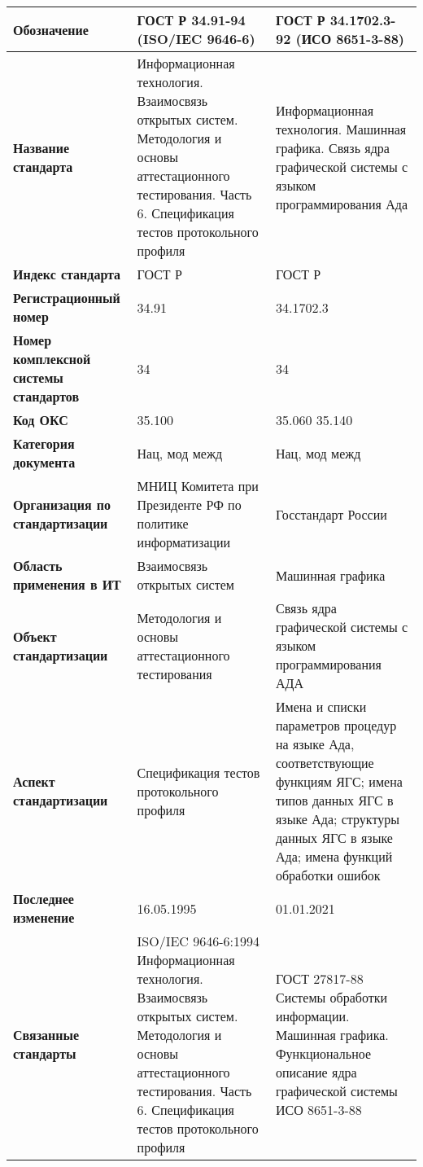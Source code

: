 \begin{table}[h!tp]
	\small
	\centering
	\caption{}
	\label{table:national:international:mod}
	\begin{tabular}{|p{10em}|p{14em}|p{14em}|}
		\hline
		\textbf{Обозначение}
			& \textbf{ГОСТ Р 34.91-94 (ISO/IEC 9646-6)}
			& \textbf{ГОСТ Р 34.1702.3-92 (ИСО 8651-3-88)} \\ \hline
		\textbf{Название стандарта}
			& Информационная технология. Взаимосвязь открытых систем. Методология и основы аттестационного тестирования. Часть 6. Спецификация тестов протокольного профиля
			& Информационная технология. Машинная графика. Связь ядра графической системы с языком программирования Ада \\ \hline
		\textbf{Индекс стандарта}
			& ГОСТ Р & ГОСТ Р \\ \hline
		\textbf{Регистрационный номер}
			& 34.91 & 34.1702.3 \\ \hline
		\textbf{Номер комплексной системы стандартов}
			& 34 & 34 \\ \hline
		\textbf{Код ОКС}
			& 35.100 & 35.060 35.140 \\ \hline
		\textbf{Категория документа}
			& Нац, мод межд & Нац, мод межд \\ \hline
		\textbf{Организация по стандартизации}
			& МНИЦ Комитета при Президенте РФ по политике информатизации
			& Госстандарт России  \\ \hline
		\textbf{Область применения в ИТ}
			& Взаимосвязь открытых систем
			& Машинная графика \\ \hline
		\textbf{Объект стандартизации}
			& Методология и основы аттестационного тестирования
			& Связь ядра графической системы с языком программирования АДА \\ \hline
		\textbf{Аспект стандартизации}
			& Спецификация тестов протокольного профиля
			& Имена и списки параметров процедур на языке Ада, соответствующие функциям ЯГС; имена типов данных ЯГС в языке Ада; структуры данных ЯГС в языке Ада; имена функций обработки ошибок \\ \hline
		\textbf{Последнее изменение}
			& 16.05.1995
			& 01.01.2021 \\ \hline
		\textbf{Связанные стандарты}
			& ISO/IEC 9646-6:1994 Информационная технология. Взаимосвязь открытых систем. Методология и основы аттестационного тестирования. Часть 6. Спецификация тестов протокольного профиля
			& ГОСТ 27817-88 Системы обработки информации. Машинная графика. Функциональное описание ядра графической системы ИСО 8651-3-88 \\ \hline
	\end{tabular}
\end{table}

